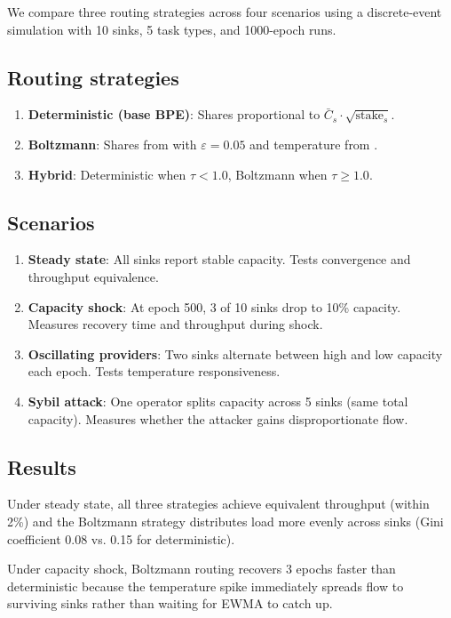 \documentclass[11pt]{article}
\theoremstyle{definition}
\theoremstyle{remark}
\newcommand{\Csmooth}{\bar{C}}
\begin{document}
We compare three routing strategies across four scenarios using a
discrete-event simulation with 10 sinks, 5 task types, and 1000-epoch
runs.

\subsection{Routing strategies}

\begin{enumerate}
\item \textbf{Deterministic (base BPE)}: Shares proportional to
  $\Csmooth_s \cdot \sqrt{\text{stake}_s}$.
\item \textbf{Boltzmann}: Shares from  with
  $\varepsilon = 0.05$ and temperature from .
\item \textbf{Hybrid}: Deterministic when $\tau < 1.0$, Boltzmann
  when $\tau \geq 1.0$.
\end{enumerate}

\subsection{Scenarios}

\begin{enumerate}
\item \textbf{Steady state}: All sinks report stable capacity. Tests
  convergence and throughput equivalence.
\item \textbf{Capacity shock}: At epoch 500, 3 of 10 sinks drop to
  10\% capacity. Measures recovery time and throughput during shock.
\item \textbf{Oscillating providers}: Two sinks alternate between
  high and low capacity each epoch. Tests temperature responsiveness.
\item \textbf{Sybil attack}: One operator splits capacity across 5
  sinks (same total capacity). Measures whether the attacker gains
  disproportionate flow.
\end{enumerate}

\subsection{Results}

Under steady state, all three strategies achieve equivalent throughput
(within 2\%) and the Boltzmann strategy distributes load more evenly
across sinks (Gini coefficient 0.08 vs. 0.15 for deterministic).

Under capacity shock, Boltzmann routing recovers 3 epochs faster than
deterministic because the temperature spike immediately spreads flow
to surviving sinks rather than waiting for EWMA to catch up.
\end{document}
